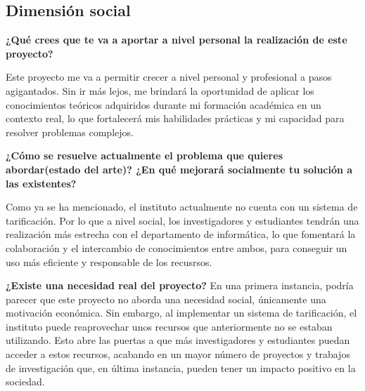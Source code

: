 \subsection{Dimensión social}

\textbf{¿Qué crees que te va a aportar a nivel personal la realización de este proyecto?}

Este proyecto me va a permitir crecer a nivel personal y profesional a pasos agigantados. 
Sin ir más lejos, me brindará la oportunidad de aplicar los conocimientos teóricos adquiridos 
durante mi formación académica en un contexto real, lo que fortalecerá mis habilidades 
prácticas y mi capacidad para resolver problemas complejos.

\textbf{¿Cómo se resuelve actualmente el problema que quieres abordar(estado del arte)? ¿En 
qué mejorará socialmente tu solución a las existentes?}

Como ya se ha mencionado, el instituto actualmente no cuenta con un sistema de tarificación.
Por lo que a nivel social, los investigadores y estudiantes tendrán una realización
más estrecha con el departamento de informática, lo que fomentará la colaboración y el
intercambio de conocimientos entre ambos, para conseguir un uso más eficiente y responsable 
de los recusrsos.

\textbf{¿Existe una necesidad real del proyecto?}
En una primera instancia, podría parecer que este proyecto no aborda una necesidad social, 
únicamente una motivación económica. Sin embargo, al implementar un sistema de tarificación, 
el instituto puede reaprovechar unos recursos que anteriormente no se estaban utilizando.
Esto abre las puertas a que más investigadores y estudiantes puedan acceder a estos recursos,
acabando en un mayor número de proyectos y trabajos de investigación que, en última instancia,
pueden tener un impacto positivo en la sociedad.